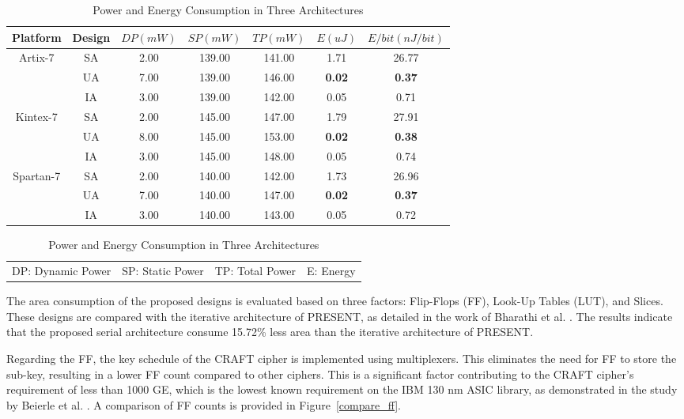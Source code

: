 \documentclass[final,5p,times,twocolumn]{elsarticle}
\begin{document}
\begin{table}
    \color{blue}
    \begin{threeparttable}
        \caption{Power and Energy Consumption in Three Architectures}\label{power_energy_compare}%
        \begin{tabular*}{\textwidth}{@{\extracolsep\fill}|c|c|c|c|c|c|c|}
            \hline
            Platform & Design & $DP(mW)$ & $SP(mW)$ & $TP(mW)$ & $E(uJ)$ & $E/bit(nJ/bit)$ \\
            \hline
            \multirow{3}{*}{Artix-7}  & SA & 2.00 & 139.00 & 141.00 & 1.71 & 26.77 \\
            & UA & 7.00 & 139.00 & 146.00 & \textbf{0.02} & \textbf{0.37} \\
            & IA & 3.00 & 139.00 & 142.00 & 0.05 & 0.71 \\
            \hline
            \multirow{3}{*}{Kintex-7} & SA & 2.00 & 145.00 & 147.00 & 1.79 & 27.91 \\
            & UA & 8.00 & 145.00 & 153.00 & \textbf{0.02} & \textbf{0.38} \\
            & IA & 3.00 & 145.00 & 148.00 & 0.05 & 0.74 \\
            \hline
            \multirow{3}{*}{Spartan-7} & SA & 2.00 & 140.00 & 142.00 & 1.73 & 26.96 \\
            & UA & 7.00 & 140.00 & 147.00 & \textbf{0.02} & \textbf{0.37} \\
            & IA & 3.00 & 140.00 & 143.00 & 0.05 & 0.72 \\
            \hline
        \end{tabular*}
        \begin{tabular}{llll}
            DP: Dynamic Power & SP: Static Power & TP: Total Power & E: Energy
        \end{tabular}
    \end{threeparttable}
\end{table}

The area consumption of the proposed designs is evaluated based on three factors: Flip-Flops (FF), Look-Up Tables (LUT), and Slices. These designs are compared with the iterative architecture of PRESENT, as detailed in the work of Bharathi et al. \cite{Bharathi2022}. The results indicate that the proposed serial architecture consume 15.72\% less area than the iterative architecture of PRESENT.

Regarding the FF, the key schedule of the CRAFT cipher is implemented using multiplexers. This eliminates the need for FF to store the sub-key, resulting in a lower FF count compared to other ciphers. This is a significant factor contributing to the CRAFT cipher's requirement of less than 1000 GE, which is the lowest known requirement on the IBM 130 nm ASIC library, as demonstrated in the study by Beierle et al. \cite{Beierle2019}. A comparison of FF counts is provided in Figure~\ref{compare_ff}.
\end{document}
